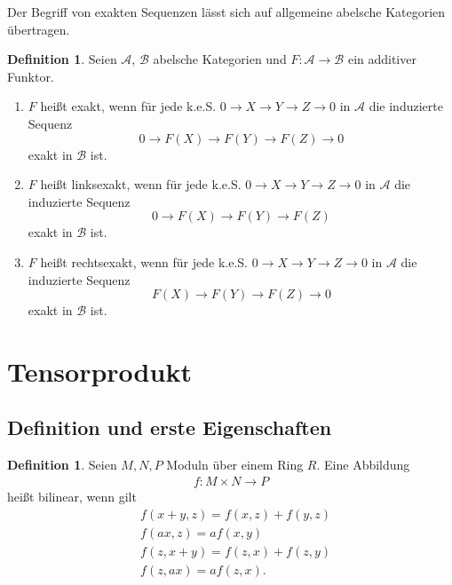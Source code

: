\documentclass[reqno,12pt]{article}
\numberwithin{equation}{section}
\newcommand{\cA}{\mathcal{A}}
\newcommand{\cB}{\mathcal{B}}
\theoremstyle{plain}
\theoremstyle{definition}
\newtheorem{definition}[thm]{Definition}
\begin{document}
\noindent Der Begriff von exakten Sequenzen lässt sich auf allgemeine abelsche Kategorien übertragen.

\begin{definition}
Seien $\cA$, $\cB$ abelsche Kategorien und $F \colon \cA \to \cB$ ein additiver Funktor.
\begin{enumerate}
  \item $F$ heißt {\sf exakt}, wenn für jede k.e.S.  $0 \to X \to Y \to Z \to 0$ in $\cA$
 die induzierte Sequenz
 $$
 0 \to F(X) \to F(Y) \to F(Z) \to 0
 $$
 exakt in $\cB$ ist.

 \item $F$ heißt {\sf linksexakt}, wenn für jede k.e.S. $0 \to X \to Y \to Z \to 0$ in $\cA$
 die induzierte Sequenz
 $$
 0 \to F(X) \to F(Y) \to F(Z)
 $$
 exakt in $\cB$ ist.

 \item $F$ heißt {\sf rechtsexakt}, wenn für jede k.e.S. $0 \to X \to Y \to Z \to 0$ in $\cA$
 die induzierte Sequenz
 $$
 F(X) \to F(Y) \to F(Z) \to 0
 $$
 exakt in $\cB$ ist.
\end{enumerate}
\end{definition}
















\newpage

\section{Tensorprodukt}

\subsection{Definition und erste Eigenschaften}

\begin{definition}
Seien $M,N,P$ Moduln über einem Ring $R$. Eine Abbildung
\begin{align*}
f \colon M \times N \to P
\end{align*}
heißt {\sf bilinear}, wenn gilt
\begin{align*}
& f(x+y, z) = f(x,z) + f(y,z) \\
& f(ax, z) = af(x,y) \\
& f(z, x+y) = f(z, x) + f(z,y) \\
& f(z,ax) = af(z,x).
\end{align*}
\end{definition}
\end{document}
